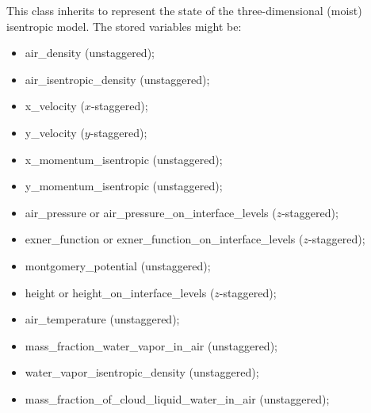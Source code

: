 \documentclass[letterpaper,10pt,english]{sphinxmanual}
\begin{document}

\begin{fulllineitems}
\label{\detokenize{api:tasmania.storages.state_isentropic.StateIsentropic}}
This class inherits {\hyperref[\detokenize{api:tasmania.storages.grid_data.GridData}]{}} to represent the state of the three-dimensional
(moist) isentropic model. The stored variables might be:
\begin{itemize}
\item {} 
air\_density (unstaggered);

\item {} 
air\_isentropic\_density (unstaggered);

\item {} 
x\_velocity (\(x\)-staggered);

\item {} 
y\_velocity (\(y\)-staggered);

\item {} 
x\_momentum\_isentropic (unstaggered);

\item {} 
y\_momentum\_isentropic (unstaggered);

\item {} 
air\_pressure or air\_pressure\_on\_interface\_levels (\(z\)-staggered);

\item {} 
exner\_function or exner\_function\_on\_interface\_levels (\(z\)-staggered);

\item {} 
montgomery\_potential (unstaggered);

\item {} 
height or height\_on\_interface\_levels (\(z\)-staggered);

\item {} 
air\_temperature (unstaggered);

\item {} 
mass\_fraction\_water\_vapor\_in\_air (unstaggered);

\item {} 
water\_vapor\_isentropic\_density (unstaggered);

\item {} 
mass\_fraction\_of\_cloud\_liquid\_water\_in\_air (unstaggered);


\end{itemize}
\end{fulllineitems}
\end{document}
